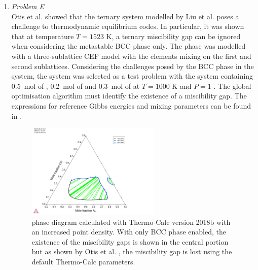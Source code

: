 \begin{enumerate}
	\item	\emph{Problem E}\\
		Otis et al. \cite{Otis:2017ab} showed that  the  ternary system modelled by Liu et al. \cite{Liu:2015aa} poses a challenge to thermodynamic equilibrium codes. In particular, it was shown that at temperature $T = 1523$  \si{\kelvin}, a ternary miscibility gap can be ignored when considering the metastable BCC phase only. The phase was modelled with a three-sublattice CEF model with the elements mixing on the first and second sublattices. Considering the challenges posed by the BCC phase in the system, the system was selected as a test problem with the system containing \SI{0.5}{\mole} of , \SI{0.2}{\mole} of  and \SI{0.3}{\mole} of  at $T = 1000$ \si{\kelvin} and $P=1$ \si{\atmosphere}. The global optimisation algorithm must identify the existence of a miscibility gap. The expressions for reference Gibbs energies and mixing parameters can be found in \cite{Liu:2015aa}.
		\begin{figure}[htbp]
			\centering
			\includegraphics[width=0.6\textwidth]{figures/chapter-6/System_AlCoCr.pdf}
			\caption[Global optimisation test problem E: BCC phase  ternary system with the miscibility gap.]{ phase diagram calculated with Thermo-Calc version 2018b with an increased point density. With only BCC phase enabled, the existence of the miscibility gaps is shown in the central portion but as shown by Otis et al. \cite{Otis:2017ab}, the miscibility gap is lost using the default Thermo-Calc parameters.}
			\label{fig:testE}
		\end{figure} 
	

\end{enumerate}
